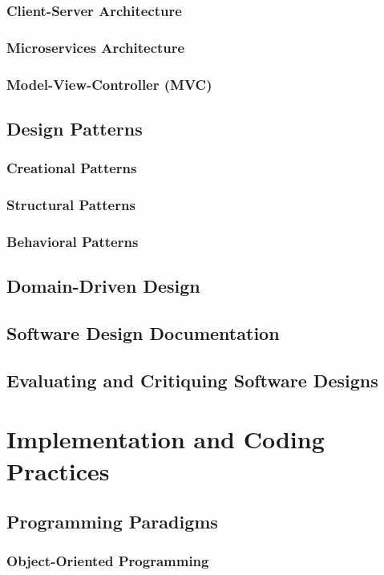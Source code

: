 \subsubsection{Client-Server Architecture}
\subsubsection{Microservices Architecture}
\subsubsection{Model-View-Controller (MVC)}
\subsection{Design Patterns}
\subsubsection{Creational Patterns}
\subsubsection{Structural Patterns}
\subsubsection{Behavioral Patterns}
\subsection{Domain-Driven Design}
\subsection{Software Design Documentation}
\subsection{Evaluating and Critiquing Software Designs}

\newpage

\section{Implementation and Coding Practices}
\subsection{Programming Paradigms}
\subsubsection{Object-Oriented Programming}
